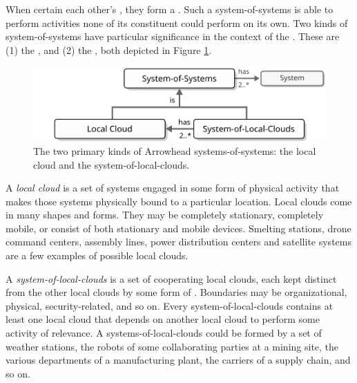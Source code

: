 When certain   each other's , they form a .
Such a system-of-systems is able to perform activities none of its constituent  could perform on its own.
Two kinds of system-of-systems have particular significance in the context of the .
These are (1) the , and (2) the , both depicted in Figure \ref{fig:system-of-systems}.

\begin{figure}[ht!]
  \centering
  \includegraphics[scale=0.9]{figures/system-of-systems}
  \caption{
    The two primary kinds of Arrowhead systems-of-systems: the local cloud and the system-of-local-clouds.
  }
  \label{fig:system-of-systems}
\end{figure}

A \textit{local cloud} is a set of systems engaged in some form of physical activity that makes those systems physically bound to a particular location.
Local clouds come in many shapes and forms.
They may be completely stationary, completely mobile, or consist of both stationary and mobile devices.
Smelting stations, drone command centers, assembly lines, power distribution centers and satellite systems are a few examples of possible local clouds.

A \textit{system-of-local-clouds} is a set of cooperating local clouds, each kept distinct from the other local clouds by some form of .
Boundaries may be organizational, physical, security-related, and so on.
Every system-of-local-clouds contains at least one local cloud that depends on another local cloud to perform some activity of relevance.
A systems-of-local-clouds could be formed by a set of weather stations, the robots of some collaborating parties at a mining site, the various departments of a manufacturing plant, the carriers of a supply chain, and so on.
